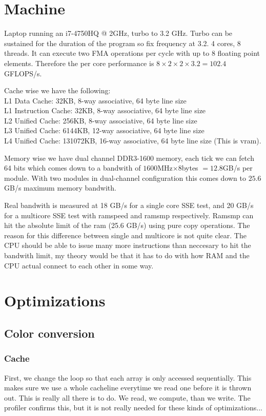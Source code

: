 \documentclass{article}
\begin{document}
\section{Machine}
Laptop running an i7-4750HQ @ 2GHz, turbo to 3.2 GHz. Turbo can be sustained for the duration of the program so fix frequency at 3.2.
4 cores, 8 threads. It can execute two FMA operations per cycle with up to 8 floating point elements.
Therefore the per core performance is $8\times 2\times 2\times 3.2=102.4$GFLOPS/s.
\par Cache wise we have the following:\\
 L1 Data Cache: 32KB, 8-way associative, 64 byte line size\\
 L1 Instruction Cache: 32KB, 8-way associative, 64 byte line size\\
 L2 Unified Cache: 256KB, 8-way associative, 64 byte line size\\
 L3 Unified Cache: 6144KB, 12-way associative, 64 byte line size\\
 L4 Unified Cache: 131072KB, 16-way associative, 64 byte line size (This is vram).\\
\par Memory wise we have dual channel DDR3-1600 memory, each tick we can fetch 64 bits which comes down to a bandwith of $1600$MHz$\times 8 $bytes $= 12.8$GB/s per module.
With two modules in dual-channel configuration this comes down to $25.6$GB/s maximum memory bandwith.

Real bandwith is measured at 18 GB/s for a single core SSE test, and 20 GB/s for a multicore SSE test with ramspeed and ramsmp respectively. Ramsmp can hit the absolute limit of the ram (25.6 GB/s) using pure copy operations.
The reason for this difference between single and multicore is not quite clear. The CPU should be able to issue many more instructions than neccesary to hit the bandwith limit, my theory would be that it has to do with how RAM and the CPU actual connect to each other in some way.

\section{Optimizations}
\subsection{Color conversion}
\subsubsection{Cache}
First, we change the loop so that each array is only accessed sequentially. This makes sure we use a whole cacheline everytime we read one before it is thrown out. This is really all there is to do. We read, we compute, than we write.
The profiler confirms this, but it is not really needed for these kinds of optimizations...
\end{document}
